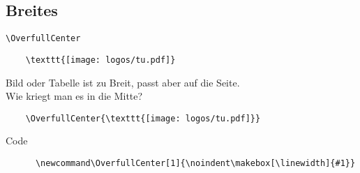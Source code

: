 \subsection{Breites}

\begin{frame}[fragile]{\texttt{\textbackslash OverfullCenter}}
  \begin{lstlisting}
    \texttt{[image: logos/tu.pdf]}
  \end{lstlisting}

  \vspace{5pt}

  \vspace{5pt}
  Bild oder Tabelle ist zu Breit, passt aber auf die Seite.\\
  Wie kriegt man es in die Mitte?

  \vspace{5pt}
  \begin{lstlisting}
    \OverfullCenter{\texttt{[image: logos/tu.pdf]}}
  \end{lstlisting}

  \vspace{5pt}

  \vspace{1em}
  \begin{block}{Code}
    \begin{lstlisting}
      \newcommand\OverfullCenter[1]{\noindent\makebox[\linewidth]{#1}}
    \end{lstlisting}
  \end{block}
\end{frame}

